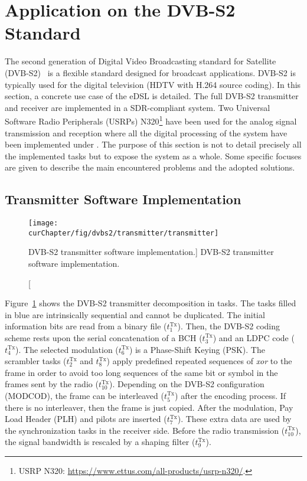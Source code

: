 \section{Application on the DVB-S2 Standard}

The second generation of Digital Video Broadcasting standard for Satellite
(DVB-S2)~\cite{ETSI2005} is a flexible standard designed for broadcast
applications. DVB-S2 is typically used for the digital television (HDTV with
H.264 source coding). In this section, a concrete use case of the \AFFECT eDSL
is detailed. The full DVB-S2 transmitter and receiver are implemented in a
SDR-compliant system. Two Universal Software Radio Peripherals (USRPs)
N320\footnote{USRP N320: \url{https://www.ettus.com/all-products/usrp-n320/}.}
have been used for the analog signal transmission and reception where all
the digital processing of the system have been implemented under \AFFECT. The
purpose of this section is not to detail precisely all the implemented tasks
but to expose the system as a whole. Some specific focuses are given to describe
the main encountered problems and the adopted solutions.

\subsection{Transmitter Software Implementation}

\begin{figure}[htp]
  \centering
  \texttt{[image: \\curChapter/fig/dvbs2/transmitter/transmitter]}
  \caption
    [DVB-S2 transmitter software implementation.]
    {DVB-S2 transmitter software implementation.}
  \label{fig:dvbs2_transmitter}
\end{figure}

Figure~\ref{fig:dvbs2_transmitter} shows the DVB-S2 transmitter decomposition in
tasks. The tasks filled in blue are intrinsically sequential and cannot be
duplicated. The initial information bits are read from a binary file
($t^\text{Tx}_1$). Then, the DVB-S2 coding scheme rests upon the serial
concatenation of a BCH ($t^\text{Tx}_3$) and an LDPC code ($t^\text{Tx}_4$). The
selected modulation ($t^\text{Tx}_6$) is a Phase-Shift Keying (PSK). The
scrambler tasks ($t^\text{Tx}_2$ and $t^\text{Tx}_8$) apply predefined repeated
sequences of \emph{xor} to the frame in order to avoid too long sequences of the
same bit or symbol in the frames sent by the radio ($t^\text{Tx}_{10}$).
Depending on the DVB-S2 configuration (MODCOD), the frame can be interleaved
($t^\text{Tx}_5$) after the encoding process. If there is no interleaver, then
the frame is just copied. After the modulation, Pay Load Header (PLH) and
pilots are inserted ($t^\text{Tx}_7$). These extra data are used by the
synchronization tasks in the receiver side. Before the radio transmission
($t^\text{Tx}_{10}$), the signal bandwidth is rescaled by a shaping filter
($t^\text{Tx}_9$).

